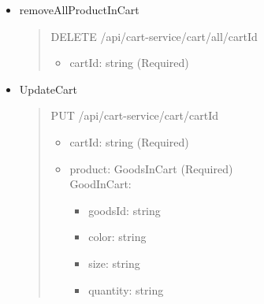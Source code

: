 \begin{itemize}
	\item removeAllProductInCart
	      \begin{quote}
		      DELETE /api/cart-service/cart/all/{cartId}
		      \begin{itemize}
			      \item cartId: string (Required)
		      \end{itemize}
	      \end{quote}

	\item UpdateCart
	      \begin{quote}
		      PUT /api/cart-service/cart/{cartId}
		      \begin{itemize}
			      \item cartId: string (Required)
			      \item product: GoodsInCart (Required)\\
							GoodInCart:
							\begin{itemize}
								\item goodsId: string 
								\item color: string 
								\item size: string 
								\item quantity: string 
							\end{itemize}
		      \end{itemize}
	      \end{quote}
\end{itemize}

